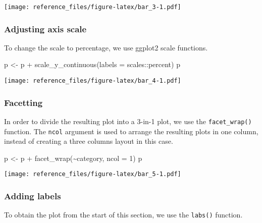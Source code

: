 \documentclass[
]{article}
\newenvironment{Shaded}{\begin{snugshade}}{\end{snugshade}}
\newcommand{\AttributeTok}[1]{\textcolor[rgb]{0.77,0.63,0.00}{#1}}
\newcommand{\DecValTok}[1]{\textcolor[rgb]{0.00,0.00,0.81}{#1}}
\newcommand{\FunctionTok}[1]{\textcolor[rgb]{0.00,0.00,0.00}{#1}}
\newcommand{\NormalTok}[1]{#1}
\newcommand{\OtherTok}[1]{\textcolor[rgb]{0.56,0.35,0.01}{#1}}
\newcommand{\SpecialCharTok}[1]{\textcolor[rgb]{0.00,0.00,0.00}{#1}}
\begin{document}
\texttt{[image: reference\_files/figure-latex/bar\_3-1.pdf]}

\hypertarget{adjusting-axis-scale}{%
\subsubsection{Adjusting axis scale}\label{adjusting-axis-scale}}

To change the scale to percentage, we use ggplot2 scale functions.

\begin{Shaded}
\begin{Highlighting}[]
\NormalTok{p }\OtherTok{\textless{}{-}}\NormalTok{ p }\SpecialCharTok{+}
  \FunctionTok{scale\_y\_continuous}\NormalTok{(}\AttributeTok{labels =}\NormalTok{ scales}\SpecialCharTok{::}\NormalTok{percent)}
\NormalTok{p}
\end{Highlighting}
\end{Shaded}

\texttt{[image: reference\_files/figure-latex/bar\_4-1.pdf]}

\hypertarget{facetting}{%
\subsubsection{Facetting}\label{facetting}}

In order to divide the resulting plot into a 3-in-1 plot, we use the
\texttt{facet\_wrap()} function. The \texttt{ncol} argument is used to
arrange the resulting plots in one column, instead of creating a three
columns layout in this case.

\begin{Shaded}
\begin{Highlighting}[]
\NormalTok{p }\OtherTok{\textless{}{-}}\NormalTok{ p }\SpecialCharTok{+}
  \FunctionTok{facet\_wrap}\NormalTok{(}\SpecialCharTok{\textasciitilde{}}\NormalTok{category, }\AttributeTok{ncol =} \DecValTok{1}\NormalTok{)}
\NormalTok{p}
\end{Highlighting}
\end{Shaded}

\texttt{[image: reference\_files/figure-latex/bar\_5-1.pdf]}

\hypertarget{adding-labels}{%
\subsubsection{Adding labels}\label{adding-labels}}

To obtain the plot from the start of this section, we use the
\texttt{labs()} function.
\end{document}
